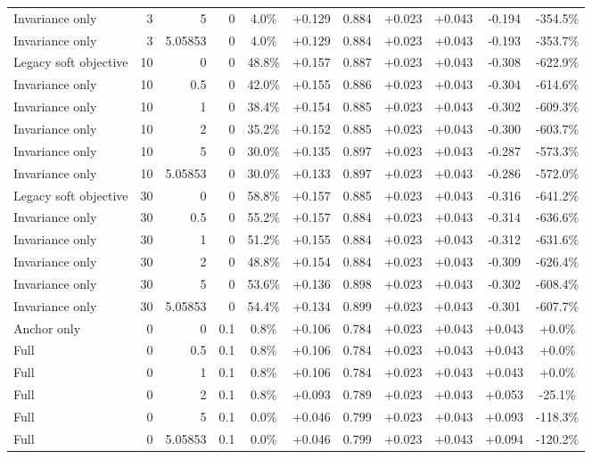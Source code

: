\begin{table}[htbp]
\begin{tabular}{lrrrccccccc}
Invariance only & 3 & 5 & 0 & 4.0\% & +0.129 & 0.884 & +0.023 & +0.043 & -0.194 & -354.5\% \\
Invariance only & 3 & 5.05853 & 0 & 4.0\% & +0.129 & 0.884 & +0.023 & +0.043 & -0.193 & -353.7\% \\
Legacy soft objective & 10 & 0 & 0 & 48.8\% & +0.157 & 0.887 & +0.023 & +0.043 & -0.308 & -622.9\% \\
Invariance only & 10 & 0.5 & 0 & 42.0\% & +0.155 & 0.886 & +0.023 & +0.043 & -0.304 & -614.6\% \\
Invariance only & 10 & 1 & 0 & 38.4\% & +0.154 & 0.885 & +0.023 & +0.043 & -0.302 & -609.3\% \\
Invariance only & 10 & 2 & 0 & 35.2\% & +0.152 & 0.885 & +0.023 & +0.043 & -0.300 & -603.7\% \\
Invariance only & 10 & 5 & 0 & 30.0\% & +0.135 & 0.897 & +0.023 & +0.043 & -0.287 & -573.3\% \\
Invariance only & 10 & 5.05853 & 0 & 30.0\% & +0.133 & 0.897 & +0.023 & +0.043 & -0.286 & -572.0\% \\
Legacy soft objective & 30 & 0 & 0 & 58.8\% & +0.157 & 0.885 & +0.023 & +0.043 & -0.316 & -641.2\% \\
Invariance only & 30 & 0.5 & 0 & 55.2\% & +0.157 & 0.884 & +0.023 & +0.043 & -0.314 & -636.6\% \\
Invariance only & 30 & 1 & 0 & 51.2\% & +0.155 & 0.884 & +0.023 & +0.043 & -0.312 & -631.6\% \\
Invariance only & 30 & 2 & 0 & 48.8\% & +0.154 & 0.884 & +0.023 & +0.043 & -0.309 & -626.4\% \\
Invariance only & 30 & 5 & 0 & 53.6\% & +0.136 & 0.898 & +0.023 & +0.043 & -0.302 & -608.4\% \\
Invariance only & 30 & 5.05853 & 0 & 54.4\% & +0.134 & 0.899 & +0.023 & +0.043 & -0.301 & -607.7\% \\
Anchor only & 0 & 0 & 0.1 & 0.8\% & +0.106 & 0.784 & +0.023 & +0.043 & +0.043 & +0.0\% \\
Full & 0 & 0.5 & 0.1 & 0.8\% & +0.106 & 0.784 & +0.023 & +0.043 & +0.043 & +0.0\% \\
Full & 0 & 1 & 0.1 & 0.8\% & +0.106 & 0.784 & +0.023 & +0.043 & +0.043 & +0.0\% \\
Full & 0 & 2 & 0.1 & 0.8\% & +0.093 & 0.789 & +0.023 & +0.043 & +0.053 & -25.1\% \\
Full & 0 & 5 & 0.1 & 0.0\% & +0.046 & 0.799 & +0.023 & +0.043 & +0.093 & -118.3\% \\
Full & 0 & 5.05853 & 0.1 & 0.0\% & +0.046 & 0.799 & +0.023 & +0.043 & +0.094 & -120.2\% \\

\end{tabular}
\end{table}
